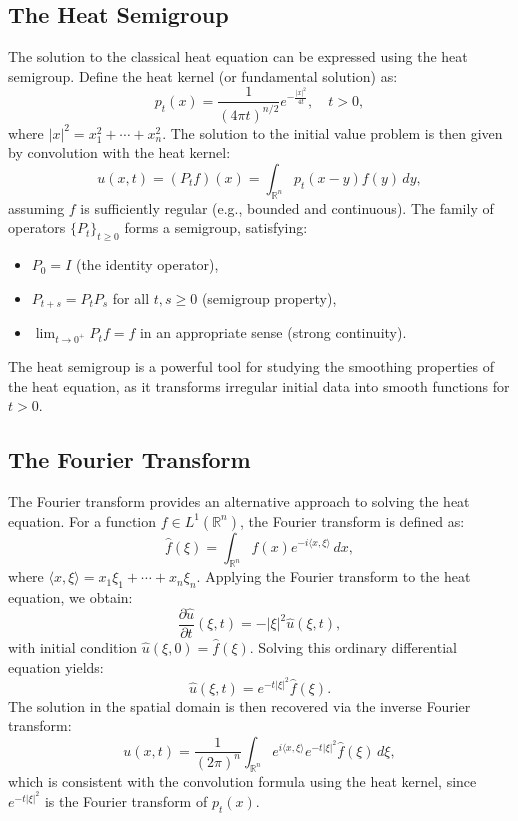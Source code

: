 \documentclass[a4paper,12pt]{article}
\begin{document}
\subsection{The Heat Semigroup}
The solution to the classical heat equation can be expressed using the heat semigroup. Define the heat kernel (or fundamental solution) as:
\begin{equation}
p_t(x) = \frac{1}{(4\pi t)^{n/2}} e^{-\frac{|x|^2}{4t}}, \quad t > 0,
\end{equation}
where $|x|^2 = x_1^2 + \cdots + x_n^2$. The solution to the initial value problem is then given by convolution with the heat kernel:
\begin{equation}
u(x,t) = (P_t f)(x) = \int_{\mathbb{R}^n} p_t(x-y) f(y) \, dy,
\end{equation}
assuming $f$ is sufficiently regular (e.g., bounded and continuous). The family of operators $\{P_t\}_{t \geq 0}$ forms a semigroup, satisfying:
\begin{itemize}
    \item $P_0 = I$ (the identity operator),
    \item $P_{t+s} = P_t P_s$ for all $t, s \geq 0$ (semigroup property),
    \item $\lim_{t \to 0^+} P_t f = f$ in an appropriate sense (strong continuity).
\end{itemize}
The heat semigroup is a powerful tool for studying the smoothing properties of the heat equation, as it transforms irregular initial data into smooth functions for $t > 0$.

\subsection{The Fourier Transform}
The Fourier transform provides an alternative approach to solving the heat equation. For a function $f \in L^1(\mathbb{R}^n)$, the Fourier transform is defined as:
\begin{equation}
\hat{f}(\xi) = \int_{\mathbb{R}^n} f(x) e^{-i \langle x, \xi \rangle} \, dx,
\end{equation}
where $\langle x, \xi \rangle = x_1 \xi_1 + \cdots + x_n \xi_n$. Applying the Fourier transform to the heat equation, we obtain:
\begin{equation}
\frac{\partial \hat{u}}{\partial t}(\xi,t) = -|\xi|^2 \hat{u}(\xi,t),
\end{equation}
with initial condition $\hat{u}(\xi,0) = \hat{f}(\xi)$. Solving this ordinary differential equation yields:
\begin{equation}
\hat{u}(\xi,t) = e^{-t |\xi|^2} \hat{f}(\xi).
\end{equation}
The solution in the spatial domain is then recovered via the inverse Fourier transform:
\begin{equation}
u(x,t) = \frac{1}{(2\pi)^n} \int_{\mathbb{R}^n} e^{i \langle x, \xi \rangle} e^{-t |\xi|^2} \hat{f}(\xi) \, d\xi,
\end{equation}
which is consistent with the convolution formula using the heat kernel, since $e^{-t |\xi|^2}$ is the Fourier transform of $p_t(x)$.
\end{document}
